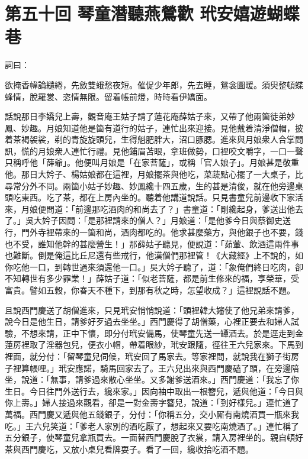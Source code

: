 
\chapter*{第五十回 琴童潛聽燕鶯歡 玳安嬉遊蝴蝶巷}


詞曰：

\begin{myquote} 
欲掩香幃論繾綣，先斂雙蛾愁夜短。催促少年郎，先去睡，鴛衾圖暖。須臾整頓蝶蜂情，脫羅裳、恣情無限。留着帳前燈，時時看伊嬌面。

\end{myquote} 

話說那日李嬌兒上壽，觀音庵王姑子請了蓮花庵薛姑子來，又帶了他兩箇徒弟妙鳳、妙趣。月娘知道他是箇有道行的姑子，連忙出來迎接。見他戴着清淨僧帽，披着茶褐袈裟，剃的青旋旋頭兒，生得魁肥胖大，沼口豚腮。進來與月娘衆人合掌問訊，慌的月娘衆人連忙行禮。見他鋪眉苫眼，拿班做勢，口裡咬文嚼字，一口一聲只稱呼他「薛爺」。他便叫月娘是「在家菩薩」，或稱「官人娘子」。月娘甚是敬重他。那日大妗子、楊姑娘都在這裡，月娘擺茶與他吃，菜蔬點心擺了一大桌子，比尋常分外不同。兩箇小姑子妙趣、妙鳳纔十四五歲，生的甚是清俊，就在他旁邊桌頭吃東西。吃了茶，都在上房內坐的。聽着他講道說話。只見書童兒前邊收下家活來，月娘便問道：「前邊那吃酒肉的和尚去了？」書童道：「剛纔起身，爹送出他去了。」吳大妗子因問：「是那裡請來的僧人？」月娘道：「是他爹今日與蔡御史送行，門外寺裡帶來的一箇和尚，酒肉都吃的。他求甚麼藥方，與他銀子也不要，錢也不受，誰知他幹的甚麼營生！」那薛姑子聽見，便說道：「茹葷、飲酒這兩件事也難斷。倒是俺這比丘尼還有些戒行，他漢僧們那裡管！《大藏經》上不說的，如你吃他一口，到轉世過來須還他一口。」吳大妗子聽了，道：「象俺們終日吃肉，卻不知轉世有多少罪業！」薛姑子道：「似老菩薩，都是前生修來的福，享榮華，受富貴。譬如五穀，你春天不種下，到那有秋之時，怎望收成？」這裡說話不題。

且說西門慶送了胡僧進來，只見玳安悄悄說道：「頭裡韓大嬸使了他兄弟來請爹，說今日是他生日，請爹好歹過去坐坐。」西門慶得了胡僧藥，心裡正要去和婦人試驗，不想來請，正中下懷，即分付玳安備馬，使琴童先送一罈酒去。於是逕走到金蓮房裡取了淫器包兒，便衣小帽，帶着眼紗，玳安跟隨，徑往王六兒家來。下馬到裡面，就分付：「留琴童兒伺候，玳安回了馬家去。等家裡問，就說我在獅子街房子裡算帳哩。」玳安應諾，騎馬回家去了。王六兒出來與西門慶磕了頭，在旁邊陪坐，說道：「無事，請爹過來散心坐坐。又多謝爹送酒來。」西門慶道：「我忘了你生日。今日往門外送行去，纔來家。」因向袖中取出一根簪兒，遞與他道：「今日與你上壽。」婦人接過來觀看，卻是一對金壽字簪兒，說道：「到好樣兒。」連忙道了萬福。西門慶又遞與他五錢銀子，分付：「你稱五分，交小厮有南燒酒買一瓶來我吃。」王六兒笑道：「爹老人家別的酒吃厭了，想起來又要吃南燒酒了。」連忙稱了五分銀子，使琴童兒拿瓶買去。一面替西門慶脫了衣裳，請入房裡坐的。親自頓好茶與西門慶吃，又放小桌兒看牌耍子。看了一回，纔收拾吃酒不題。

